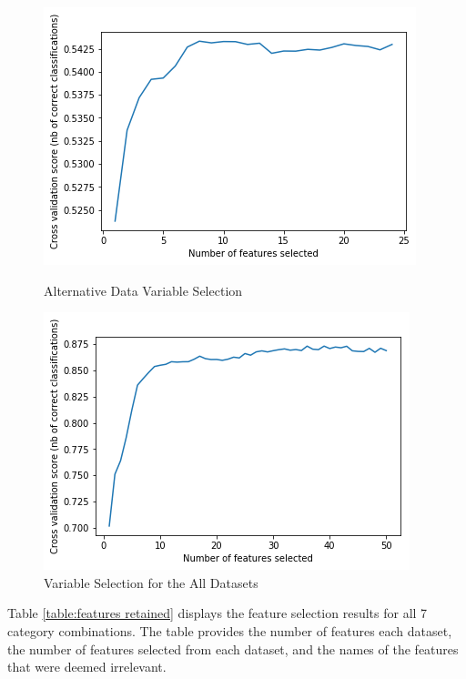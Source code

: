 \begin{figure}[!htb]
\centering
  \begin{minipage}{0.5\textwidth}
    \includegraphics[width=\textwidth]{images/alt_only.png}
    \caption{Alternative Data Variable Selection}
    \label{fig:alt}
  \end{minipage}%
  \begin{minipage}{0.5\textwidth}
    \includegraphics[width=\textwidth]{images/sd_cb_alt.png}
    \caption{Variable Selection for the All Datasets}
    \label{fig:all}
  \end{minipage}
\end{figure}

\vspace{10 pt}


Table \ref{table:features retained} displays the feature selection results for all 7 category combinations. The table provides the number of features each dataset, the number of features selected from each dataset, and the names of the features that were deemed irrelevant. \\

